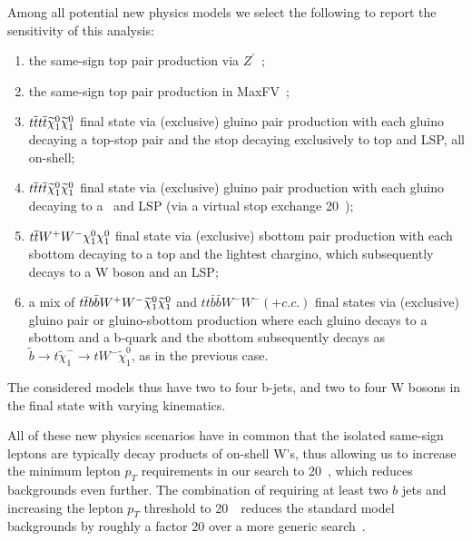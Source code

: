 Among all potential new physics models we select the following to report the sensitivity of this analysis:
\begin{enumerate}
\item the same-sign top pair production via $Z^\prime$~\cite{sstop,fcnczprime};
\item the same-sign top pair production in MaxFV~\cite{mxflv3};
\item $t\overline{t} t\overline{t} \widetilde\chi_1^0\widetilde\chi_1^0$ final state via (exclusive) gluino pair production with 
each gluino decaying a top-stop pair and the stop decaying
exclusively to top and LSP, all on-shell;
\item $t\overline{t} t\overline{t} \widetilde\chi_1^0\widetilde\chi_1^0$ final state via (exclusive) gluino pair production with 
each gluino decaying to a \ttbar\ and LSP (via a virtual stop exchange 20~\TeV);
\item $t\overline{t} W^+W^- \chi_1^0\chi_1^0 $ final state via (exclusive) sbottom pair production with each 
sbottom decaying to a top and the lightest chargino, which subsequently decays to a W boson and an LSP;
\item a mix of $t\overline{t} b\bar{b} W^+W^- \widetilde\chi_1^0\widetilde\chi_1^0 $ and 
  $tt \bar{b}\bar{b} W^- W^-  (+c.c.)$ final states via (exclusive) gluino pair or gluino-sbottom
  production where each gluino decays to a sbottom and a b-quark and the sbottom subsequently decays as
  $\widetilde{b} \to t \widetilde{\chi}^-_1 \to t W^- \widetilde{\chi}^0_1  $, as in the previous case.
\end{enumerate}
The considered models thus have two to four b-jets, and two to four W bosons in the final state with varying kinematics.

All of these new physics scenarios have in common that the isolated same-sign leptons are typically decay products of on-shell W's,
thus allowing us to increase the minimum lepton $p_T$ requirements in our search to 20~\GeV, which reduces backgrounds even further.
The combination of requiring at least two $b$ jets and increasing the lepton $p_T$ threshold to 20~\GeV\ reduces the standard model backgrounds
by roughly a factor 20 over a more generic search~\cite{sspaper2010,sspaper2011}.


 
